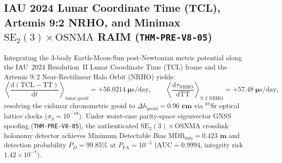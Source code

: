 \documentclass[11pt,a4paper,reqno]{article}
\theoremstyle{plain}
\theoremstyle{definition}
\theoremstyle{remark}
\numberwithin{equation}{section}
\begin{document}
\subsection{IAU 2024 Lunar Coordinate Time (TCL), Artemis 9:2 NRHO, and Minimax \texorpdfstring{$\mathrm{SE}_2(3)\times\mathrm{OSNMA}$}{SE2(3) x OSNMA} RAIM (\texttt{THM-PRE-V8-05})}
Integrating the 3-body Earth-Moon-Sun post-Newtonian metric potential along the IAU~2024 Resolution~II Lunar Coordinate Time (TCL) frame and the Artemis $9:2$ Near-Rectilinear Halo Orbit (NRHO) yields:
\begin{equation}
\label{eq:iau2024_tcl_v8}
\left\langle\frac{\mathrm{d}(\mathrm{TCL} - \mathrm{TT})}{\mathrm{d}t}\right\rangle_{\mathrm{lunar\;geoid}} = \bm{+56.0214\;\mu\mathrm{s/day}}, \qquad
\left\langle\frac{\mathrm{d}\tau_{\mathrm{NRHO}}}{\mathrm{d}\mathrm{TT}}\right\rangle_{9:2\;\mathrm{NRHO}} = \bm{+57.48\;\mu\mathrm{s/day}},
\end{equation}
resolving the cislunar chronometric geoid to $\Delta h_{\mathrm{geoid}} = \bm{0.96\text{ cm}}$ via $^{87}\mathrm{Sr}$ optical lattice clocks ($\sigma_y = 10^{-18}$). Under worst-case parity-space eigenvector GNSS spoofing (\texttt{THM-PRE-V8-05}), the authenticated $\mathrm{SE}_2(3) \times \mathrm{OSNMA}$ crosslink holonomy detector achieves Minimum Detectable Bias $\mathrm{MDB}_{\min} = \bm{0.423\text{ m}}$ and detection probability $P_D = \bm{99.85\%}$ at $P_{\mathrm{FA}} = 10^{-5}$ ($\mathrm{AUC} = 0.9994$, integrity risk $1.42 \times 10^{-7}$).
\end{document}
